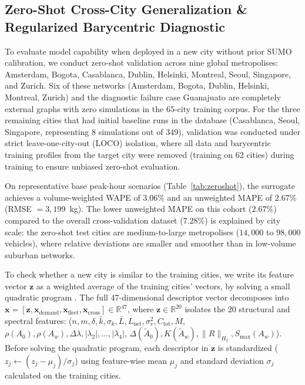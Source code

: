 \documentclass[journal]{IEEEtran}
\begin{document}
\subsection{Zero-Shot Cross-City Generalization \& Regularized Barycentric Diagnostic}
To evaluate model capability when deployed in a new city without prior SUMO calibration, we conduct zero-shot validation across nine global metropolises: Amsterdam, Bogota, Casablanca, Dublin, Helsinki, Montreal, Seoul, Singapore, and Zurich. Six of these networks (Amsterdam, Bogota, Dublin, Helsinki, Montreal, Zurich) and the diagnostic failure case Guanajuato are completely external graphs with zero simulations in the 65-city training corpus. For the three remaining cities that had initial baseline runs in the database (Casablanca, Seoul, Singapore, representing 8 simulations out of 349), validation was conducted under strict leave-one-city-out (LOCO) isolation, where all data and barycentric training profiles from the target city were removed (training on 62 cities) during training to ensure unbiased zero-shot evaluation.

On representative base peak-hour scenarios (Table~\ref{tab:zeroshot}), the surrogate achieves a volume-weighted WAPE of $3.06\%$ and an unweighted MAPE of $2.67\%$ (RMSE $= 3,199$~kg). The lower unweighted MAPE on this cohort ($2.67\%$) compared to the overall cross-validation dataset ($7.28\%$) is explained by city scale: the zero-shot test cities are medium-to-large metropolises ($14,000$ to $98,000$ vehicles), where relative deviations are smaller and smoother than in low-volume suburban networks.

To check whether a new city is similar to the training cities, we write its feature vector $\mathbf{z}$ as a weighted average of the training cities' vectors, by solving a small quadratic program \cite{Boyd2004}. The full 47-dimensional descriptor vector decomposes into $\mathbf{x} = [\mathbf{z}, \mathbf{x}_{\text{demand}}, \mathbf{x}_{\text{fleet}}, \mathbf{x}_{\text{cross}}] \in \mathbb{R}^{47}$, where $\mathbf{z} \in \mathbb{R}^{20}$ isolates the 20 structural and spectral features: ($n, m, \delta, \bar{k}, \sigma_k, \bar{L}, L_{\text{net}}, \sigma_v^2, C_{\text{tot}}, M$,\\ $\rho(A_0), \rho(A_w), \Delta\lambda, |\lambda_2|, \dots, |\lambda_4|$, $\Delta(\tilde{A}_0), K(\tilde{A}_w), \|R\|_{H_2}, S_{\max}(A_w)$). Before solving the quadratic program, each descriptor in $\mathbf{z}$ is standardized ($z_j \leftarrow (z_j - \mu_j) / \sigma_j$) using feature-wise mean $\mu_j$ and standard deviation $\sigma_j$ calculated on the training cities.
\end{document}
